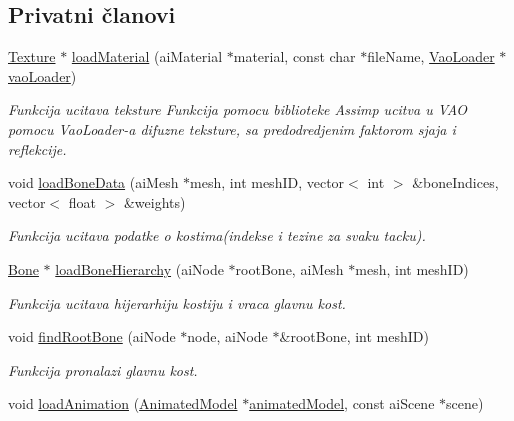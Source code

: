 \subsection*{Privatni članovi}
\begin{DoxyCompactItemize}
\item 
\hyperlink{classtexture_1_1Texture}{Texture} $\ast$ \hyperlink{classcore_1_1Loader_ab1e01bdf019c36ce9b4c3a83d194f9fc}{load\+Material} (ai\+Material $\ast$material, const char $\ast$file\+Name, \hyperlink{classcore_1_1VaoLoader}{Vao\+Loader} $\ast$\hyperlink{namespacecore_a78dd24784c415d3759a0f71b8f4f9f81}{vao\+Loader})
\begin{DoxyCompactList}\small\item\em Funkcija ucitava teksture Funkcija pomocu biblioteke Assimp ucitva u V\+AO pomocu Vao\+Loader-\/a difuzne teksture, sa predodredjenim faktorom sjaja i reflekcije. \end{DoxyCompactList}\item 
void \hyperlink{classcore_1_1Loader_acfe1b4eb91cac78068c8c1edefe460b3}{load\+Bone\+Data} (ai\+Mesh $\ast$mesh, int mesh\+ID, vector$<$ int $>$ \&bone\+Indices, vector$<$ float $>$ \&weights)
\begin{DoxyCompactList}\small\item\em Funkcija ucitava podatke o kostima(indekse i tezine za svaku tacku). \end{DoxyCompactList}\item 
\hyperlink{classmodel_1_1Bone}{Bone} $\ast$ \hyperlink{classcore_1_1Loader_a86badeeb7089e9c2e8d0dea8be60bbe9}{load\+Bone\+Hierarchy} (ai\+Node $\ast$root\+Bone, ai\+Mesh $\ast$mesh, int mesh\+ID)
\begin{DoxyCompactList}\small\item\em Funkcija ucitava hijerarhiju kostiju i vraca glavnu kost. \end{DoxyCompactList}\item 
void \hyperlink{classcore_1_1Loader_aae32d85640af5eb6d4a9c8e27fc0e83e}{find\+Root\+Bone} (ai\+Node $\ast$node, ai\+Node $\ast$\&root\+Bone, int mesh\+ID)
\begin{DoxyCompactList}\small\item\em Funkcija pronalazi glavnu kost. \end{DoxyCompactList}\item 
void \hyperlink{classcore_1_1Loader_a228087d022e5102cc4e40b12e7ecf9fa}{load\+Animation} (\hyperlink{classmodel_1_1AnimatedModel}{Animated\+Model} $\ast$\hyperlink{namespacecore_a32acc9ced9824face25fb6376f19427c}{animated\+Model}, const ai\+Scene $\ast$scene)

\end{DoxyCompactItemize}
